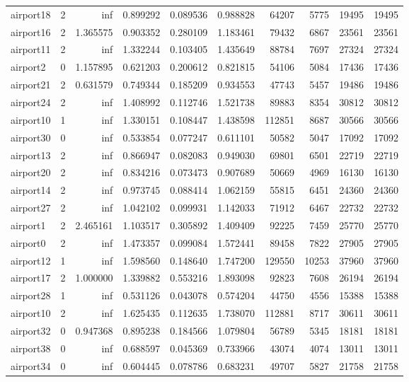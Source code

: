 \begin{longtable}{|l|r|r|r|r|r|r|r|r|r|}
airport18 & 2 & inf & 0.899292 & 0.089536 & 0.988828 & 64207 & 5775 & 19495 & 19495 \\
airport16 & 2 & 1.365575 & 0.903352 & 0.280109 & 1.183461 & 79432 & 6867 & 23561 & 23561 \\
airport11 & 2 & inf & 1.332244 & 0.103405 & 1.435649 & 88784 & 7697 & 27324 & 27324 \\
airport2 & 0 & 1.157895 & 0.621203 & 0.200612 & 0.821815 & 54106 & 5084 & 17436 & 17436 \\
airport21 & 2 & 0.631579 & 0.749344 & 0.185209 & 0.934553 & 47743 & 5457 & 19486 & 19486 \\
airport24 & 2 & inf & 1.408992 & 0.112746 & 1.521738 & 89883 & 8354 & 30812 & 30812 \\
airport10 & 1 & inf & 1.330151 & 0.108447 & 1.438598 & 112851 & 8687 & 30566 & 30566 \\
airport30 & 0 & inf & 0.533854 & 0.077247 & 0.611101 & 50582 & 5047 & 17092 & 17092 \\
airport13 & 2 & inf & 0.866947 & 0.082083 & 0.949030 & 69801 & 6501 & 22719 & 22719 \\
airport20 & 2 & inf & 0.834216 & 0.073473 & 0.907689 & 50669 & 4969 & 16130 & 16130 \\
airport14 & 2 & inf & 0.973745 & 0.088414 & 1.062159 & 55815 & 6451 & 24360 & 24360 \\
airport27 & 2 & inf & 1.042102 & 0.099931 & 1.142033 & 71912 & 6467 & 22732 & 22732 \\
airport1 & 2 & 2.465161 & 1.103517 & 0.305892 & 1.409409 & 92225 & 7459 & 25770 & 25770 \\
airport0 & 2 & inf & 1.473357 & 0.099084 & 1.572441 & 89458 & 7822 & 27905 & 27905 \\
airport12 & 1 & inf & 1.598560 & 0.148640 & 1.747200 & 129550 & 10253 & 37960 & 37960 \\
airport17 & 2 & 1.000000 & 1.339882 & 0.553216 & 1.893098 & 92823 & 7608 & 26194 & 26194 \\
airport28 & 1 & inf & 0.531126 & 0.043078 & 0.574204 & 44750 & 4556 & 15388 & 15388 \\
airport10 & 2 & inf & 1.625435 & 0.112635 & 1.738070 & 112881 & 8717 & 30611 & 30611 \\
airport32 & 0 & 0.947368 & 0.895238 & 0.184566 & 1.079804 & 56789 & 5345 & 18181 & 18181 \\
airport38 & 0 & inf & 0.688597 & 0.045369 & 0.733966 & 43074 & 4074 & 13011 & 13011 \\
airport34 & 0 & inf & 0.604445 & 0.078786 & 0.683231 & 49707 & 5827 & 21758 & 21758 \\

\end{longtable}

